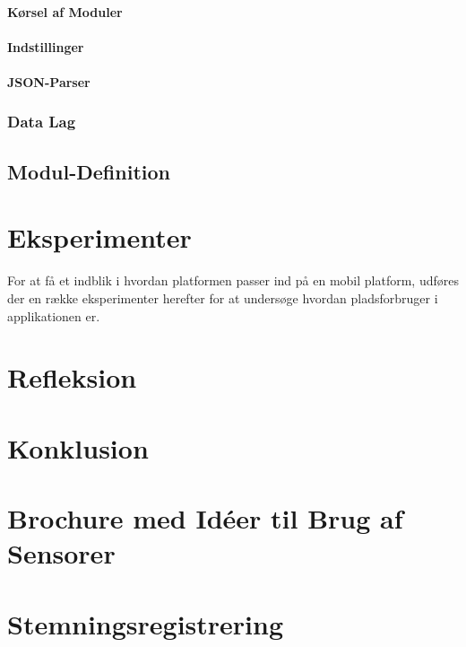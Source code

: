 \subsubsection{Kørsel af Moduler}

\subsubsection{Indstillinger}\label{sec:settings}

\subsubsection{JSON-Parser}\label{subsub:JSONparser}

\subsection{Data Lag}

\section{Modul-Definition}\label{modul_definition}


\chapter{Eksperimenter}\label{eksperimenter}
For at få et indblik i hvordan platformen passer ind på en mobil platform, udføres der en række eksperimenter herefter for at undersøge hvordan pladsforbruger i applikationen er.


\chapter{Refleksion}


\chapter{Konklusion}





\label{bib:mybiblio}

\appendix



\chapter{Brochure med Idéer til Brug af Sensorer}\label{app:brochure}
 

\chapter{Stemningsregistrering}\label{app:stemningsregistrering}


